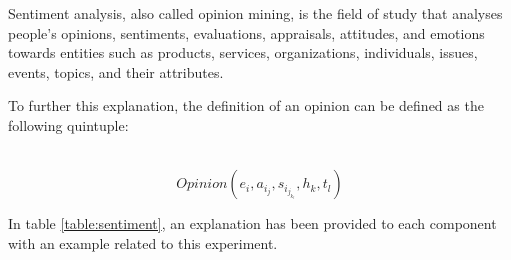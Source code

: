 \documentclass[a4paper,11pt]{report}
\begin{document}
\begin{displayquote}
Sentiment analysis, also called opinion mining, is the field of study that analyses people’s opinions, sentiments, evaluations, appraisals, attitudes, and emotions towards entities such as products, services, organizations, individuals, issues, events, topics, and their attributes.
\end{displayquote}

To further this explanation, the definition of an opinion can be defined as the following quintuple:

\\\[Opinion (e_i, a_i_j, s_i_j_k_l, h_k, t_l)\]

In table \ref{table:sentiment}, an explanation has been provided to each component with an example related to this experiment.
\end{document}

